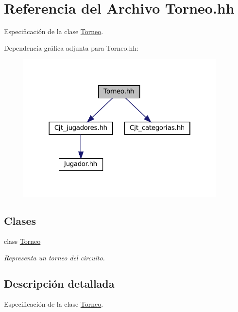 \hypertarget{_torneo_8hh}{}\section{Referencia del Archivo Torneo.\+hh}
\label{_torneo_8hh}


Especificación de la clase \hyperlink{class_torneo}{Torneo}.  


Dependencia gráfica adjunta para Torneo.\+hh\+:\nopagebreak
\begin{figure}[H]
\begin{center}
\leavevmode
\includegraphics[width=298pt]{_torneo_8hh__incl}
\end{center}
\end{figure}
\subsection*{Clases}
\begin{DoxyCompactItemize}
\item 
class \hyperlink{class_torneo}{Torneo}
\begin{DoxyCompactList}\small\item\em Representa un torneo del circuito. \end{DoxyCompactList}\end{DoxyCompactItemize}


\subsection{Descripción detallada}
Especificación de la clase \hyperlink{class_torneo}{Torneo}. 

